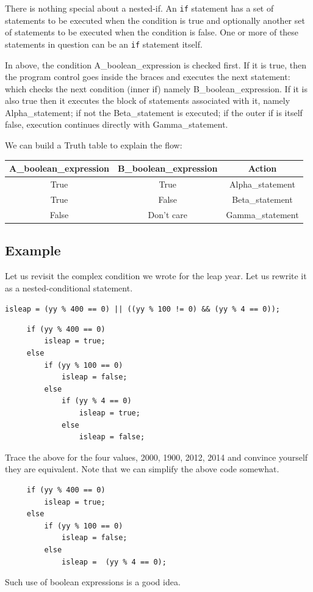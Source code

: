 \documentclass[11pt,a4paper]{article}
\begin{document}
There is nothing special about a nested-if. An \lstinline!if! statement has a set of statements to be executed when the condition is true and optionally another set of statements to be executed when the condition is false. One or more of these statements in question can be an \lstinline!if! statement itself.

In above, the condition A\_boolean\_expression is checked first. If it is true, then the program control goes inside the braces and executes the next statement: which checks the next condition (inner if) namely B\_boolean\_expression. If it is also true then it executes the block of statements associated with it, namely Alpha\_statement; if not the Beta\_statement is executed; if the outer if is itself false, execution continues directly with Gamma\_statement.

We can build a Truth table to explain the flow:

\begin{tabular}{|c|c|c|}\hline
A\_boolean\_expression & B\_boolean\_expression & Action\\\hline
True                 & True                 & Alpha\_statement\\\hline
True                 & False                & Beta\_statement\\\hline
False                & Don't care           & Gamma\_statement\\\hline
\end{tabular}

\subsection*{Example}
Let us revisit the complex condition we wrote for the leap year. Let us rewrite it as a nested-conditional statement.

\texttt{isleap = (yy \% 400 == 0) || ((yy \% 100 != 0) \&\& (yy \% 4 == 0));}

\begin{lstlisting}
     if (yy % 400 == 0)
         isleap = true;
     else 
         if (yy % 100 == 0)
             isleap = false;
         else
             if (yy % 4 == 0)
                 isleap = true;
             else
                 isleap = false;
\end{lstlisting}

Trace the above for the four values, 2000, 1900, 2012, 2014 and convince yourself they are equivalent. Note that we can simplify the above code somewhat. 
\begin{lstlisting}
     if (yy % 400 == 0)
         isleap = true;
     else 
         if (yy % 100 == 0)
             isleap = false;
         else
             isleap =  (yy % 4 == 0);
\end{lstlisting}
Such use of boolean expressions is a good idea.
\end{document}
